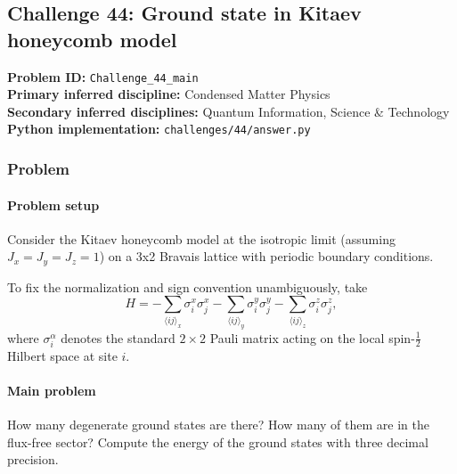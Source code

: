 \subsection[Challenge 44: Ground state in Kitaev honeycomb model]{Challenge 44: Ground state in Kitaev honeycomb model}
\textbf{Problem ID:} \texttt{Challenge\_44\_main}\\
\textbf{Primary inferred discipline:} Condensed Matter Physics\\
\textbf{Secondary inferred disciplines:} Quantum Information, Science \& Technology\\
\textbf{Python implementation:} \texttt{challenges/44/answer.py}

\subsubsection*{Problem}
\paragraph*{Problem setup}
Consider the Kitaev honeycomb model at the isotropic limit (assuming $J_x=J_y=J_z=1$) on a 3x2 Bravais lattice with periodic boundary conditions.

{\color{blue}
To fix the normalization and sign convention unambiguously, take
\[
H=-\sum_{\langle ij\rangle_x}\sigma_i^x\sigma_j^x
  -\sum_{\langle ij\rangle_y}\sigma_i^y\sigma_j^y
  -\sum_{\langle ij\rangle_z}\sigma_i^z\sigma_j^z,
\]
where $\sigma_i^\alpha$ denotes the standard $2\times2$ Pauli matrix acting on the local spin-$\tfrac12$ Hilbert space at site $i$.
}

\paragraph*{Main problem}
How many degenerate ground states are there? How many of them are in the flux-free sector? Compute the energy of the ground states with three decimal precision.
